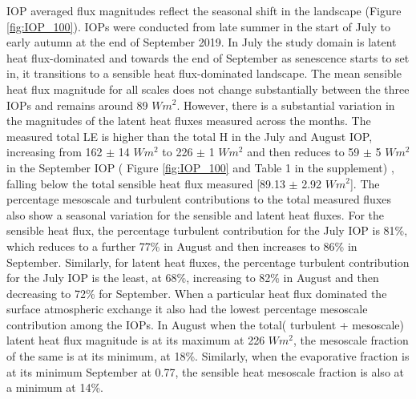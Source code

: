 \documentclass[draft]{agujournal2019}
\begin{document}
IOP averaged flux magnitudes reflect the seasonal shift in the landscape (Figure \ref{fig:IOP_100}). IOPs were conducted from late summer in the start of July to early autumn at the end of September 2019. In July the study domain is latent heat flux-dominated and towards the end of September as senescence starts to set in, it transitions to a sensible heat flux-dominated landscape. The mean sensible heat flux magnitude for all scales does not change substantially between the three IOPs  and remains around 89 $W m^{2}$. However, there is a substantial variation in the magnitudes of the latent heat fluxes measured across the months. The measured total LE is higher than the total H in the July and August IOP, increasing from 162 $\pm$ 14 $W m^{2}$ to 226 $\pm$ 1 $W m^{2}$ and then reduces to 59 $\pm$ 5 $W m^{2}$ in the September IOP ( Figure \ref{fig:IOP_100} and Table 1 in the supplement) , falling below the total sensible heat flux measured [89.13 $\pm$ 2.92 $W m^{2}$]. The percentage mesoscale and turbulent contributions to the total measured fluxes also show a seasonal variation for the sensible and latent heat fluxes. For the sensible heat flux, the percentage turbulent contribution for the July IOP is 81\%, which reduces to a further 77\% in August and then increases to 86\% in September. Similarly, for latent heat fluxes, the percentage turbulent contribution for the July IOP is the least, at 68\%, increasing to 82\% in August and then decreasing to 72\% for September. When a particular heat flux dominated the surface atmospheric exchange it also had the lowest percentage mesoscale contribution among the IOPs. In August when the total( turbulent + mesoscale) latent heat flux magnitude is at its maximum at 226 $W m^{2}$, the mesoscale fraction of the same is at its minimum, at 18\%. Similarly, when the evaporative fraction is at its minimum September at 0.77, the sensible heat mesoscale fraction is also at a minimum at 14\%.
\end{document}
